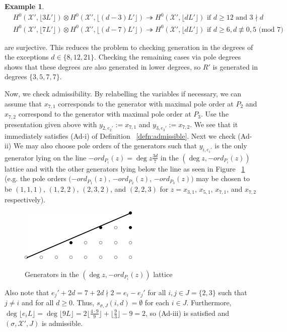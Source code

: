 \documentclass{amsart}
\theoremstyle{plain}
\theoremstyle{definition}
\newtheorem{example}[thm]{Example}
\theoremstyle{remark}
\numberwithin{equation}{section}
\newcommand \sx{\mathscr X}
\newcommand{\halfcan}{L}
\begin{document}
\begin{example}
\begin{align*}
	&H^0 (\sx', \lfloor 3 \halfcan' \rfloor) \otimes H^0 (\sx', \lfloor
	(d - 3) \halfcan' \rfloor) \twoheadrightarrow H^0 (\sx', \lfloor
	d \halfcan' \rfloor) \text{ if } d \geq 12 \text{ and } 3 \nmid d \\
	&H^0 (\sx', \lfloor 7 \halfcan' \rfloor) \otimes H^0 (\sx', \lfloor
	(d - 7) \halfcan' \rfloor) \twoheadrightarrow H^0 (\sx', \lfloor
	d \halfcan' \rfloor) \text{ if } d \geq 6, d \not\equiv 0, 5
	\text{ (mod } 7)
\end{align*}

\noindent
are surjective. This reduces the problem to checking generation
in the degrees of the exceptions $d \in \{8, 12, 21\}$.
Checking the remaining cases via pole degrees shows that
these degrees are also generated in lower degrees,
so $R'$ is generated in degrees $\{3, 5, 7, 7\}$.

Now, we check admissibility. By relabelling the
variables if necessary, we can assume that $x_{7, 1}$ corresponds
to the generator with maximal pole order at $P_2$ and $x_{7, 2}$
correspond to the generator with maximal pole order at $P_3$. Use
the presentation given above with $y _{2, e_2'} := x_{7, 1}$ and
$y_{3, e_3'} :=  x_{7, 2}$. We see that it immediately satisfies
(Ad-i) of Definition ~\ref{defn:admissible}. Next we check (Ad-ii) We may also choose
pole orders of the generators such that $y_{i, e_i'}$ is the only
generator lying on the line $-ord_{P_i}(z) = \deg z \frac{3d}{7}$
in the $(\deg z, -ord_{P_i}(z))$  lattice and with the other
generators lying below the line as seen in Figure ~\ref{fig:377}
(e.g. the pole orders $(-ord_{P_1}(z)$, $-ord_{P_2}(z)$, $-ord_{P_3}
(z))$ may be chosen to be $(1, 1, 1)$, $(1, 2, 2)$, $(2, 3, 2)$,
and $(2, 2, 3)$ for $z = x_{3, 1}$, $x_{5, 1}$, $x_{7, 1}$, and
$x_{7, 2}$ respectively).

\begin{figure}[H]
\includegraphics{pics/spin-377-pic-pics.pdf} \\
\caption{Generators in the $(\deg z, -ord_{P_i}(z))$ lattice}
\label{fig:377}
\end{figure}

Also note that $e_j' + 2d = 7 + 2d \nmid 2 = e_i - e_j'$ for all
$i, j \in J = \{2, 3\}$ such that $j \neq i$ and for all $d \geq
0$. Thus, $s_{\sigma, J}(i, d) = \emptyset$ for each $i \in J$.
Furthermore, $\deg \lfloor e_i \halfcan \rfloor = \deg \lfloor 9
\halfcan \rfloor = 2 \lfloor \frac{4 \cdot 9}{9} \rfloor + \lfloor
\frac{9}{3} \rfloor - 9 = 2$, so (Ad-iii) is satisfied and
$(\sigma, \sx', J)$ is admissible.


\end{example}
\end{document}
